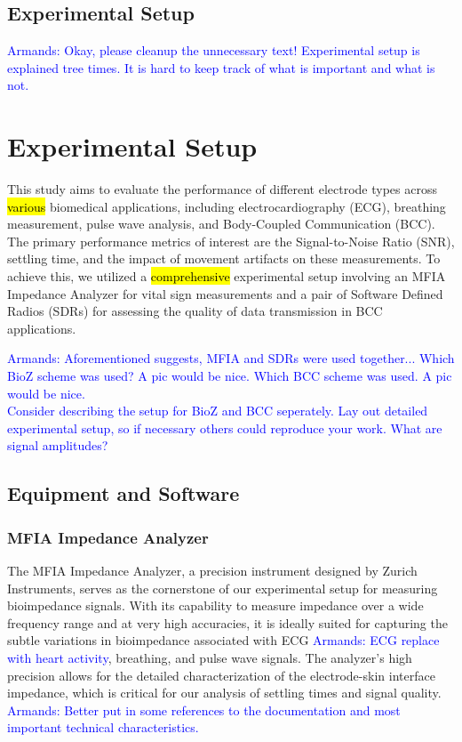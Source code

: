 \documentclass[conference]{IEEEtran}
\newcommand{\notea}[1]{\textcolor{blue}{Armands: #1}}
\begin{document}
\subsection{Experimental Setup}
\notea{Okay, please cleanup the unnecessary text! Experimental setup is explained tree times. It is hard to keep track of what is important and what is not.}
\section{Experimental Setup}

This study aims to evaluate the performance of different electrode types across \hl{various} biomedical applications, including electrocardiography (ECG), breathing measurement, pulse wave analysis, and Body-Coupled Communication (BCC). The primary performance metrics of interest are the Signal-to-Noise Ratio (SNR), settling time, and the impact of movement artifacts on these measurements. To achieve this, we utilized a \hl{comprehensive} experimental setup involving an MFIA Impedance Analyzer for vital sign measurements and a pair of Software Defined Radios (SDRs) for assessing the quality of data transmission in BCC applications.

\notea{Aforementioned suggests, MFIA and SDRs were used together... Which BioZ scheme was used? A pic would be nice. Which BCC scheme was used. A pic would be nice. \\ Consider describing the setup for BioZ and BCC seperately. Lay out detailed experimental setup, so if necessary others could reproduce your work. What are signal amplitudes?}

\subsection{Equipment and Software}

\subsubsection{MFIA Impedance Analyzer}
The MFIA Impedance Analyzer, a precision instrument designed by Zurich Instruments, serves as the cornerstone of our experimental setup for measuring bioimpedance signals. With its capability to measure impedance over a wide frequency range and at very high accuracies, it is ideally suited for capturing the subtle variations in bioimpedance associated with ECG \notea{ECG replace with heart activity}, breathing, and pulse wave signals. The analyzer's high precision allows for the detailed characterization of the electrode-skin interface impedance, which is critical for our analysis of settling times and signal quality. \notea{Better put in some references to the documentation and most important technical characteristics. }
\end{document}
